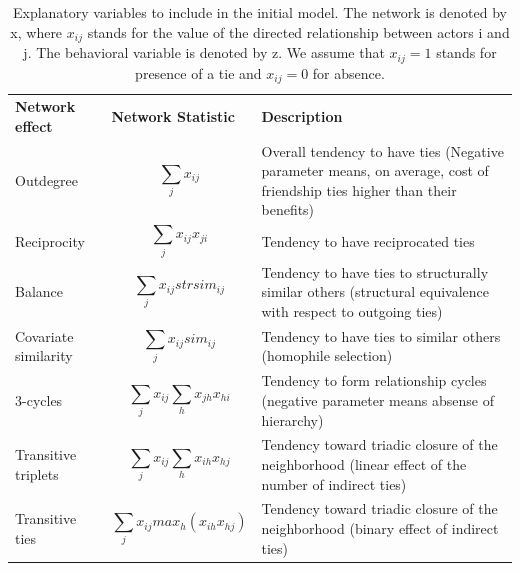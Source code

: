 \documentclass[11pt]{report}
\begin{document}
\begin{table}[!ht]
\centering
\caption{Explanatory variables to include in the initial model. \cite{Steglich} The network is denoted by x, where $ x_{ij} $ stands for the value of the directed relationship between actors i and j. The behavioral variable is denoted by z. We assume that $ x_{ij} = 1 $ stands for presence of a tie and $ x_{ij} = 0 $ for absence. } 
\label{tableCovariates}
\begin{tabular}{m{} m{} m{}}
\hline\noalign{\smallskip}
\textbf{Network effect} & \textbf{Network Statistic} & \textbf{Description} \\
\noalign{\smallskip}\hline\noalign{\smallskip}
Outdegree & \begin{equation*} \sum_j x_{ij} \end{equation*} & Overall tendency to have ties (Negative parameter means, on average, cost of friendship ties higher than their benefits) \\ 
Reciprocity & \begin{equation*} \sum_j x_{ij} x_{ji} \end{equation*} & Tendency to have reciprocated ties \\ 
Balance & \begin{equation*} \sum_j x_{ij}strsim_{ij} \end{equation*} & Tendency to have ties to structurally similar others (structural equivalence with respect to outgoing ties) \\ 
Covariate similarity & \begin{equation*} \sum_j x_{ij} sim_{ij} \end{equation*} & Tendency to have ties to similar others (homophile selection) \\ 
3-cycles & \begin{equation*} \sum_j x_{ij} \sum_h x_{jh}x_{hi} \end{equation*} & Tendency to form relationship cycles (negative parameter means absense of hierarchy) \\
Transitive triplets & \begin{equation*} \sum_j x_{ij} \sum_h x_{ih}x_{hj} \end{equation*} &  Tendency toward triadic closure of the neighborhood (linear effect of the number of indirect ties) \\
Transitive ties & \begin{equation*} \sum_j x_{ij} max_h (x_{ih}x_{hj}) \end{equation*} & Tendency toward triadic closure of the neighborhood (binary effect of indirect ties) \\

\end{tabular}
\end{table}
\end{document}
